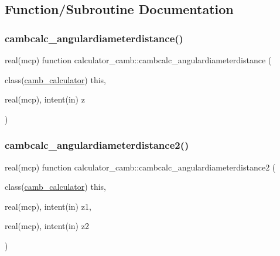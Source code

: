 \subsection{Function/\+Subroutine Documentation}
\mbox{\label{namespacecalculator__camb_a40bf5a8b3435b93efcaa688ecb4867f4}} 
\subsubsection{\texorpdfstring{cambcalc\+\_\+angulardiameterdistance()}{cambcalc\_angulardiameterdistance()}}
{\footnotesize\ttfamily real(mcp) function calculator\+\_\+camb\+::cambcalc\+\_\+angulardiameterdistance (\begin{DoxyParamCaption}\item[{class(\mbox{\hyperlink{structcalculator__camb_1_1camb__calculator}{camb\+\_\+calculator}})}]{this,  }\item[{real(mcp), intent(in)}]{z }\end{DoxyParamCaption})}

\mbox{\label{namespacecalculator__camb_a368f4f92f978124067f561deb5392714}} 
\subsubsection{\texorpdfstring{cambcalc\+\_\+angulardiameterdistance2()}{cambcalc\_angulardiameterdistance2()}}
{\footnotesize\ttfamily real(mcp) function calculator\+\_\+camb\+::cambcalc\+\_\+angulardiameterdistance2 (\begin{DoxyParamCaption}\item[{class(\mbox{\hyperlink{structcalculator__camb_1_1camb__calculator}{camb\+\_\+calculator}})}]{this,  }\item[{real(mcp), intent(in)}]{z1,  }\item[{real(mcp), intent(in)}]{z2 }\end{DoxyParamCaption})}


